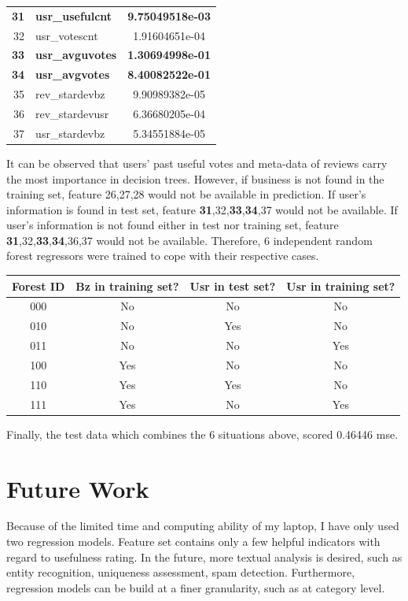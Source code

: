 \documentclass[a4paper,12pt,title]{article}
\begin{document}
\begin{center}
\begin{tabular}{rlc}
\bfseries{31} & \bfseries{usr\_usefulcnt} & \bfseries{9.75049518e-03}\\
32 & usr\_votescnt & 1.91604651e-04\\
\bfseries{33} & \bfseries{usr\_avguvotes} & \bfseries{1.30694998e-01}\\
\bfseries{34} & \bfseries{usr\_avgvotes} & \bfseries{8.40082522e-01}\\
35 & rev\_stardevbz & 9.90989382e-05\\
36 & rev\_stardevusr & 6.36680205e-04\\
37 & usr\_stardevbz & 5.34551884e-05
\end{tabular}
\end{center}

It can be observed that users' past useful votes and meta-data of reviews carry the most importance in decision trees. However, if business is not found in the training set, feature 26,27,28 would not be available in prediction. If user's information is found in test set, feature \textbf{31},32,\textbf{33},\textbf{34},37 would not be available. If user's information is not found either in test nor training set, feature \textbf{31},32,\textbf{33},\textbf{34},36,37 would not be available.  Therefore, 6 independent random forest regressors were trained to cope with their respective cases. 

\begin{center}
\begin{tabular}{cccc}
\textbf{Forest ID} & \textbf{Bz in training set?} & \textbf{Usr in test set?} & \textbf{Usr in training set?}\\
\hline
\hline
000 & No & No & No\\
010 & No & Yes & No\\
011 & No & No & Yes\\
100 & Yes & No & No\\
110 & Yes & Yes & No\\
111 & Yes & No & Yes\\
\end{tabular}
\end{center}

Finally, the test data which combines the 6 situations above, scored 0.46446 mse.

\section{Future Work}
Because of the limited time and computing ability of my laptop, I have only used two regression models. Feature set contains only a few helpful indicators with regard to usefulness rating. In the future, more textual analysis is desired, such as entity recognition, uniqueness assessment, spam detection. Furthermore, regression models can be build at a finer granularity, such as at category level.
\end{document}
